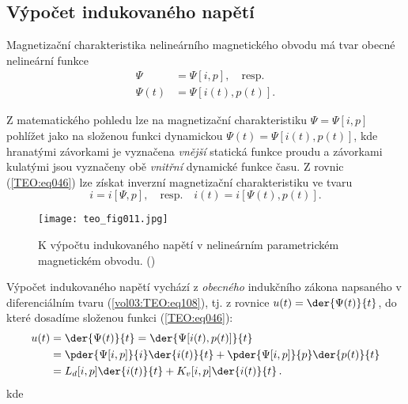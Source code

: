     \subsection{Výpočet indukovaného napětí}
      Magnetizační charakteristika nelineárního magnetického obvodu má tvar obecné nelineární funkce
      \begin{align}\label{TEO:eq046}
        \Psi    &= \Psi[i,p], \quad\text{resp.}   \nonumber \\
        \Psi(t) &= \Psi[i(t), p(t)].
      \end{align}
    
      Z matematického pohledu lze na magnetizační charakteristiku \(\Psi = \Psi[i,p]\) pohlížet 
      jako na složenou funkci dynamickou \(\Psi(t) = \Psi[i(t),p(t)]\), kde hranatými závorkami je 
      vyznačena \emph{vnější} statická funkce proudu a závorkami kulatými jsou vyznačeny obě 
      \emph{vnitřní} dynamické funkce času. Z rovnic (\ref{TEO:eq046}) lze získat inverzní 
      magnetizační charakteristiku ve tvaru
      \begin{equation}\label{TEO:eq047}
        i = i[\Psi, p], \quad\text{resp.}\quad i(t) = i[\Psi(t), p(t)].
      \end{equation}

      \begin{figure}[ht!]  %
        \centering
        \texttt{[image: teo\_fig011.jpg]}
        \caption{K výpočtu indukovaného napětí v nelineárním parametrickém magnetickém obvodu. 
                (\cite[s.~161]{Patocka4})}
        \label{teo:fig011}
      \end{figure}
      
      Výpočet indukovaného napětí vychází z \emph{obecného} indukčního zákona napsaného v 
      diferenciálním tvaru (\ref{vol03:TEO:eq108}), tj. z rovnice \(u(t) = \der{\Psi(t)}{t}\), do 
      které dosadíme složenou funkci (\ref{TEO:eq046}):
      \begin{align}
        u(t) &= \der{\Psi(t)}{t} = \der{\Psi[i(t),p(t)]}{t}                   \nonumber \\
             &= \pder{\Psi[i, p]}{i}\der{i(t)}{t} 
              + \pder{\Psi[i, p]}{p}\der{p(t)}{t}                             \nonumber \\
             &= L_d[i,p]\der{i(t)}{t} 
              + K_v[i,p]\der{i(t)}{t}\,.                                      \label{TEO:eq048}
      \end{align}
      kde 
           
